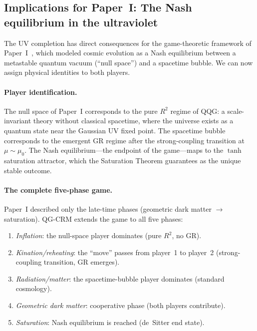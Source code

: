 \documentclass[aps,prd,twocolumn,superscriptaddress,nofootinbib]{revtex4-2}
\begin{document}
\subsection{Implications for Paper~I: The Nash equilibrium in the ultraviolet}
\label{sec:paper1-implications}

The UV completion has direct consequences for the game-theoretic framework of Paper~I~\cite{Geiger2026}, which modeled cosmic evolution as a Nash equilibrium between a metastable quantum vacuum (``null space'') and a spacetime bubble. We can now assign physical identities to both players.

\paragraph{Player identification.}
The null space of Paper~I corresponds to the pure $R^2$ regime of QQG: a scale-invariant theory without classical spacetime, where the universe exists as a quantum state near the Gaussian UV fixed point. The spacetime bubble corresponds to the emergent GR regime after the strong-coupling transition at $\mu \sim \mu_0$. The Nash equilibrium---the endpoint of the game---maps to the $\tanh$ saturation attractor, which the Saturation Theorem guarantees as the unique stable outcome.

\paragraph{The complete five-phase game.}
Paper~I described only the late-time phases (geometric dark matter $\to$ saturation). QG-CRM extends the game to all five phases:
\begin{enumerate}
\item \textit{Inflation}: the null-space player dominates (pure $R^2$, no GR).
\item \textit{Kination/reheating}: the ``move'' passes from player~1 to player~2 (strong-coupling transition, GR emerges).
\item \textit{Radiation/matter}: the spacetime-bubble player dominates (standard cosmology).
\item \textit{Geometric dark matter}: cooperative phase (both players contribute).
\item \textit{Saturation}: Nash equilibrium is reached (de~Sitter end state).
\end{enumerate}
\end{document}

